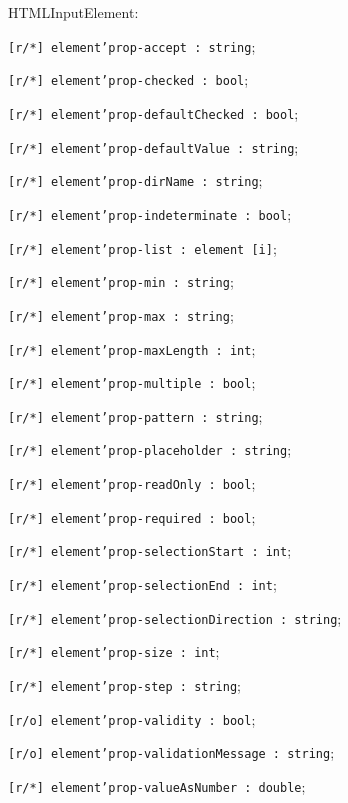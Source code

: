 \begin{icItems}
	\item HTMLInputElement:
	\begin{icItems}
		\item \texttt{[r/*] element'prop-accept : string};
		\item \texttt{[r/*] element'prop-checked : bool};
		\item \texttt{[r/*] element'prop-defaultChecked : bool};
		\item \texttt{[r/*] element'prop-defaultValue : string};
		\item \texttt{[r/*] element'prop-dirName : string};
		\item \texttt{[r/*] element'prop-indeterminate : bool};
		\item \texttt{[r/*] element'prop-list : element [i]};
		\item \texttt{[r/*] element'prop-min : string};
		\item \texttt{[r/*] element'prop-max : string};
		\item \texttt{[r/*] element'prop-maxLength : int};
		\item \texttt{[r/*] element'prop-multiple : bool};
		\item \texttt{[r/*] element'prop-pattern : string};
		\item \texttt{[r/*] element'prop-placeholder : string};
		\item \texttt{[r/*] element'prop-readOnly : bool};
		\item \texttt{[r/*] element'prop-required : bool};
		\item \texttt{[r/*] element'prop-selectionStart : int};
		\item \texttt{[r/*] element'prop-selectionEnd : int};
		\item \texttt{[r/*] element'prop-selectionDirection : string};
		\item \texttt{[r/*] element'prop-size : int};
		\item \texttt{[r/*] element'prop-step : string};
		\item \texttt{[r/o] element'prop-validity : bool};
		\item \texttt{[r/o] element'prop-validationMessage : string};
		\item \texttt{[r/*] element'prop-valueAsNumber : double};
	\end{icItems}
	

\end{icItems}
